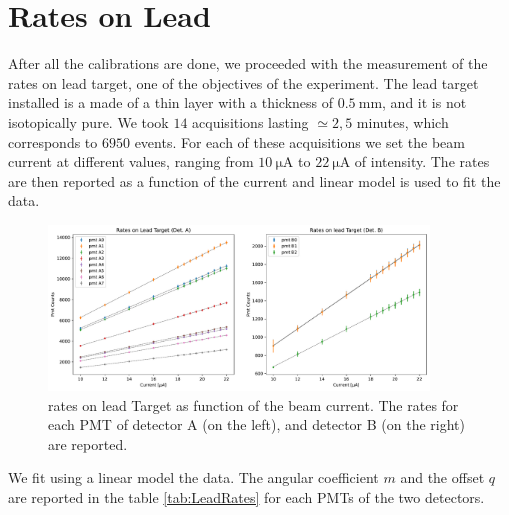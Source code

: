 \section{Rates on Lead}

After all the calibrations are done, we proceeded with the measurement of the rates on lead target, one of the objectives of the experiment.
The lead target installed is a made of a thin layer with a thickness of $\SI{0.5}{\milli \meter}$, and it is not isotopically pure.
We took $14$ acquisitions lasting $\simeq 2,5$ minutes, which corresponds to $6950$ events. For each of these acquisitions we set the beam current at different values, ranging from $\SI{10}{\micro \ampere}$ to $\SI{22}{\micro \ampere}$ of intensity. The rates are then reported as a function of the current and linear model is used to fit the data.

\begin{figure}[hbtp]
\centering
\includegraphics[width = 0.9\textwidth]{Analysis/LeadRates/LeadRates.pdf}
\caption{rates on lead Target as function of the beam current. The rates for each PMT of detector A (on the left), and detector B (on the right) are reported.}
\end{figure}

We fit using a linear model the data. The angular coefficient $m$ and the offset $q$ are reported in the table \ref{tab:LeadRates} for each PMTs of the two detectors.  

